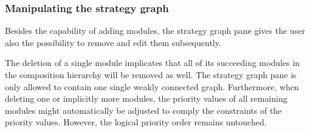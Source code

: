 \subsubsection{Manipulating the strategy graph}
\label{sec:manipulating_the_strategy_graph}
Besides the capability of adding modules, the strategy graph pane gives the user also the possibility to remove and edit them subsequently.

The deletion of a single module implicates that all of its succeeding modules in the composition hierarchy will be removed as well. The strategy graph pane is only allowed to contain one single weakly connected graph. Furthermore, when deleting one or implicitly more modules, the priority values of all remaining modules might automatically be adjusted to comply the constraints of the priority values. However, the logical priority order remains untouched.

